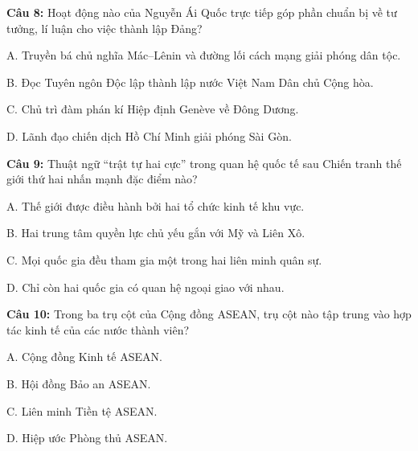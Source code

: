 \documentclass[12pt,a4paper]{article}
\begin{document}
\par\noindent\begin{minipage}{\linewidth}
\noindent\textbf{Câu 8:} Hoạt động nào của Nguyễn Ái Quốc trực tiếp góp phần chuẩn bị về tư tưởng, lí luận cho việc thành lập Đảng?\par
\noindent A. Truyền bá chủ nghĩa Mác--Lênin và đường lối cách mạng giải phóng dân tộc.\par
\noindent B. Đọc Tuyên ngôn Độc lập thành lập nước Việt Nam Dân chủ Cộng hòa.\par
\noindent C. Chủ trì đàm phán kí Hiệp định Genève về Đông Dương.\par
\noindent D. Lãnh đạo chiến dịch Hồ Chí Minh giải phóng Sài Gòn.\par
\end{minipage}\par\vspace{0.12cm}

\par\noindent\begin{minipage}{\linewidth}
\noindent\textbf{Câu 9:} Thuật ngữ “trật tự hai cực” trong quan hệ quốc tế sau Chiến tranh thế giới thứ hai nhấn mạnh đặc điểm nào?\par
\noindent A. Thế giới được điều hành bởi hai tổ chức kinh tế khu vực.\par
\noindent B. Hai trung tâm quyền lực chủ yếu gắn với Mỹ và Liên Xô.\par
\noindent C. Mọi quốc gia đều tham gia một trong hai liên minh quân sự.\par
\noindent D. Chỉ còn hai quốc gia có quan hệ ngoại giao với nhau.\par
\end{minipage}\par\vspace{0.12cm}

\par\noindent\begin{minipage}{\linewidth}
\noindent\textbf{Câu 10:} Trong ba trụ cột của Cộng đồng ASEAN, trụ cột nào tập trung vào hợp tác kinh tế của các nước thành viên?\par
\noindent A. Cộng đồng Kinh tế ASEAN.\par
\noindent B. Hội đồng Bảo an ASEAN.\par
\noindent C. Liên minh Tiền tệ ASEAN.\par
\noindent D. Hiệp ước Phòng thủ ASEAN.\par
\end{minipage}\par\vspace{0.12cm}
\end{document}
